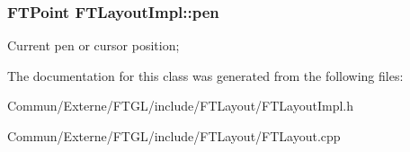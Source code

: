 \subsubsection[{\texorpdfstring{pen}{pen}}]{\setlength{\rightskip}{0pt plus 5cm}F\+T\+Point F\+T\+Layout\+Impl\+::pen\hspace{0.3cm}{\ttfamily [protected]}}\hypertarget{class_f_t_layout_impl_aefaff875c0cf4fe5710897f614be44ac}{}\label{class_f_t_layout_impl_aefaff875c0cf4fe5710897f614be44ac}
Current pen or cursor position; 

The documentation for this class was generated from the following files\+:\begin{DoxyCompactItemize}
\item 
Commun/\+Externe/\+F\+T\+G\+L/include/\+F\+T\+Layout/F\+T\+Layout\+Impl.\+h\item 
Commun/\+Externe/\+F\+T\+G\+L/include/\+F\+T\+Layout/F\+T\+Layout.\+cpp\end{DoxyCompactItemize}
